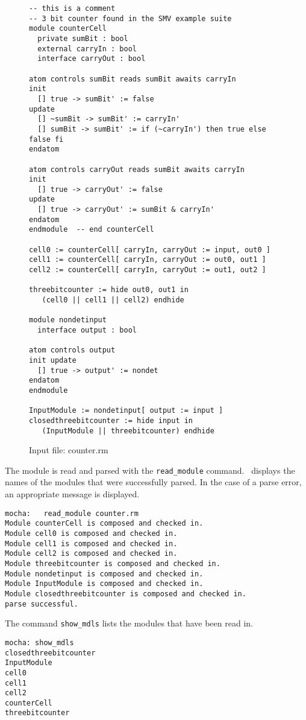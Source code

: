 \begin{figure}
\begin{verbatim}
-- this is a comment
-- 3 bit counter found in the SMV example suite 
module counterCell
  private sumBit : bool
  external carryIn : bool
  interface carryOut : bool

atom controls sumBit reads sumBit awaits carryIn 
init
  [] true -> sumBit' := false
update
  [] ~sumBit -> sumBit' := carryIn'
  [] sumBit -> sumBit' := if (~carryIn') then true else false fi
endatom

atom controls carryOut reads sumBit awaits carryIn
init
  [] true -> carryOut' := false
update
  [] true -> carryOut' := sumBit & carryIn'
endatom
endmodule  -- end counterCell

cell0 := counterCell[ carryIn, carryOut := input, out0 ]
cell1 := counterCell[ carryIn, carryOut := out0, out1 ]
cell2 := counterCell[ carryIn, carryOut := out1, out2 ]

threebitcounter := hide out0, out1 in
   (cell0 || cell1 || cell2) endhide

module nondetinput
  interface output : bool

atom controls output
init update
  [] true -> output' := nondet
endatom 
endmodule 

InputModule := nondetinput[ output := input ]
closedthreebitcounter := hide input in
   (InputModule || threebitcounter) endhide
\end{verbatim}
\caption{Input file: counter.rm}
\label{fig:finalfile}
\end{figure}

The module  is read and parsed with the {\tt read\_module} command.
\mocha\ displays the names of the modules that were successfully
parsed. In the case of a parse error, an appropriate message is
displayed. 

\begin{verbatim}
mocha:   read_module counter.rm
Module counterCell is composed and checked in.
Module cell0 is composed and checked in.
Module cell1 is composed and checked in.
Module cell2 is composed and checked in.
Module threebitcounter is composed and checked in.
Module nondetinput is composed and checked in.
Module InputModule is composed and checked in.
Module closedthreebitcounter is composed and checked in.
parse successful.
\end{verbatim}

The command {\tt show\_mdls} lists the modules that have been read
in. 

\begin{verbatim}
mocha: show_mdls
closedthreebitcounter
InputModule         
cell0               
cell1               
cell2               
counterCell         
threebitcounter     
\end{verbatim}

